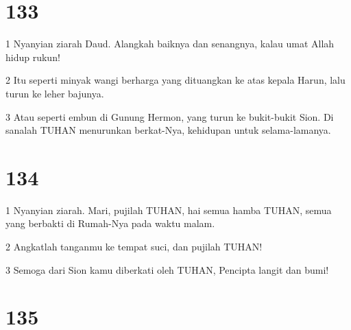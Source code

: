 \chapter{133}

\par 1 Nyanyian ziarah Daud. Alangkah baiknya dan senangnya, kalau umat Allah hidup rukun!
\par 2 Itu seperti minyak wangi berharga yang dituangkan ke atas kepala Harun, lalu turun ke leher bajunya.
\par 3 Atau seperti embun di Gunung Hermon, yang turun ke bukit-bukit Sion. Di sanalah TUHAN menurunkan berkat-Nya, kehidupan untuk selama-lamanya.

\chapter{134}

\par 1 Nyanyian ziarah. Mari, pujilah TUHAN, hai semua hamba TUHAN, semua yang berbakti di Rumah-Nya pada waktu malam.
\par 2 Angkatlah tanganmu ke tempat suci, dan pujilah TUHAN!
\par 3 Semoga dari Sion kamu diberkati oleh TUHAN, Pencipta langit dan bumi!

\chapter{135}

